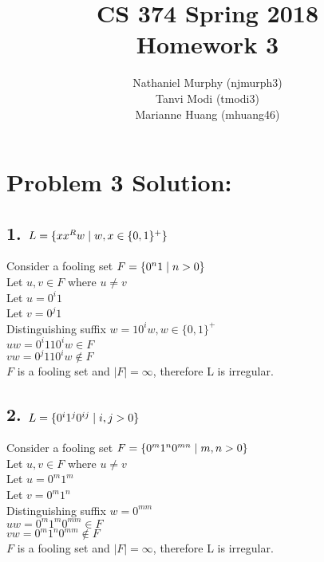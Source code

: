 \documentclass[11pt]{article}
\title{\textbf{CS 374 Spring 2018 \\
				Homework 3}}
\author{Nathaniel Murphy (njmurph3) \\
		Tanvi Modi (tmodi3) \\
		Marianne Huang (mhuang46)}
\date{}
\begin{document}
\maketitle

\section*{Problem 3 Solution:}

\subsection*{1. $L = \{xx^Rw\hspace{1mm}|\hspace{1mm}w,x \in \{0, 1\}^+\}$}
\begin{addmargin}[2em]{0em}
Consider a fooling set $F = \{0^n1\hspace{1mm}|\hspace{1mm}n>0\}$ \\
Let $u, v \in F$ where $u \neq v$ \\
Let $u = 0^i1$ \\
Let $v = 0^j1$ \\
Distinguishing suffix $w = 10^iw, w \in \{0, 1\}^+$ \\
$uw = 0^i110^iw \in F$ \\
$vw = 0^j110^iw \notin F$ \\
$F$ is a fooling set and $|F| = \infty$, therefore L is irregular.
\end{addmargin}

\subsection*{2. $L = \{0^i1^j0^{ij}\hspace{1mm}|\hspace{1mm}i,j > 0\}$}
\begin{addmargin}[2em]{0em}
Consider a fooling set $F = \{0^m1^n0^{mn}\hspace{1mm}|\hspace{1mm}m,n > 0\}$ \\
Let $u, v \in F$ where $u \neq v$ \\
Let $u = 0^m1^m$ \\
Let $v = 0^m1^n$ \\
Distinguishing suffix $w = 0^{mm}$ \\
$uw = 0^m1^m0^{mm} \in F$ \\
$vw = 0^m1^n0^{mm} \notin F$ \\
$F$ is a fooling set and $|F| = \infty$, therefore L is irregular.
\end{addmargin}
\end{document}
